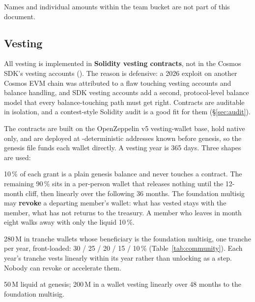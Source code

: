 Names and individual amounts within the team bucket are not part of this
document. 

\subsection{Vesting}
\label{sec:vesting}

All vesting is implemented in \textbf{Solidity vesting contracts}, not in the
Cosmos SDK's  vesting accounts (). The reason is defensive:
a 2026 exploit on another Cosmos EVM chain was attributed to a flaw touching
vesting accounts and balance handling, and SDK vesting accounts add a second,
protocol-level balance model that every balance-touching path must get right.
Contracts are auditable in isolation, and a contest-style Solidity audit is a
good fit for them (\S\ref{sec:audit}).

The contracts are built on the OpenZeppelin v5 vesting-wallet base, hold native
\kash{} only, and are deployed at -deterministic addresses known
before genesis, so the genesis file funds each wallet directly. A vesting year
is 365 days. Three shapes are used:

\begin{description}[style=nextline]
\item[Team grants (revocable).] 10\,\% of each grant is a plain genesis balance
  and never touches a contract. The remaining 90\,\% sits in a per-person
  wallet that releases nothing until the 12-month cliff, then linearly over the
  following 36 months. The foundation multisig may \textbf{revoke} a departing
  member's wallet: what has vested stays with the member, what has not returns
  to the treasury. A member who leaves in month eight walks away with only
  the liquid 10\,\%.
\item[Community grants and incentives (non-revocable).] 280\,M in tranche
  wallets whose beneficiary is the foundation multisig, one tranche per year,
  front-loaded: 30 / 25 / 20 / 15 / 10\,\% (Table~\ref{tab:community}). Each
  year's tranche vests linearly within its year rather than unlocking as a
  step. Nobody can revoke or accelerate them.
\item[Treasury (non-revocable).] 50\,M liquid at genesis; 200\,M in a wallet
  vesting linearly over 48 months to the foundation multisig.
\end{description}

